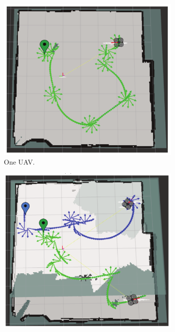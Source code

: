 \documentclass[11pt,openany]{book}
\begin{document}
\begin{figure}[H]
    \centering
    \begin{subfigure}[H]{0.5\linewidth}
        \includegraphics[width=\linewidth]{assets/3_16_a.png}
        \caption{{One UAV.}}
        \label{fig:3.16a}
    \end{subfigure}
    \begin{subfigure}[H]{0.5\linewidth}
        \includegraphics[width=\linewidth]{assets/3_16_b.png}

\end{subfigure}
\end{figure}
\end{document}
